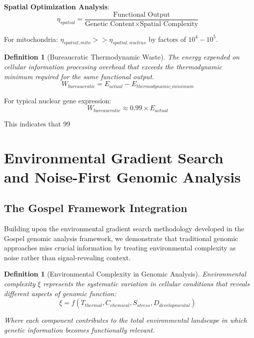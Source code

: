 \documentclass[12pt,a4paper]{article}
\newtheorem{definition}[theorem]{Definition}
\begin{document}
\textbf{Spatial Optimization Analysis}:
$$\eta_{spatial} = \frac{\text{Functional Output}}{\text{Genetic Content} \times \text{Spatial Complexity}}$$

For mitochondria: $\eta_{spatial,mito} >> \eta_{spatial,nucleus}$ by factors of $10^4-10^5$.

\begin{definition}[Bureaucratic Thermodynamic Waste]
The energy expended on cellular information processing overhead that exceeds the thermodynamic minimum required for the same functional output.
$$W_{bureaucratic} = E_{actual} - E_{thermodynamic\_minimum}$$
\end{definition}

For typical nuclear gene expression:
$$W_{bureaucratic} \approx 0.99 \times E_{actual}$$

This indicates that 99%

\section{Environmental Gradient Search and Noise-First Genomic Analysis}

\subsection{The Gospel Framework Integration}

Building upon the environmental gradient search methodology developed in the Gospel genomic analysis framework, we demonstrate that traditional genomic approaches miss crucial information by treating environmental complexity as noise rather than signal-revealing context.

\begin{definition}[Environmental Complexity in Genomic Analysis]
Environmental complexity $\xi$ represents the systematic variation in cellular conditions that reveals different aspects of genomic function:
$$\xi = f(T_{thermal}, C_{chemical}, S_{stress}, D_{developmental})$$

Where each component contributes to the total environmental landscape in which genetic information becomes functionally relevant.
\end{definition}
\end{document}
